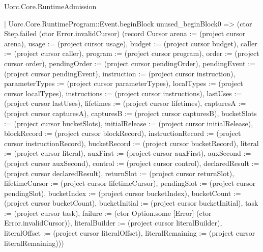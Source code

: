 \begin{lexlean}{Uorc.Core.RuntimeAdmission}
\begin{semanticmodule}
{          | Uorc.Core.RuntimeProgram::Event.beginBlock unused_beginBlock0 => (ctor Step.failed (ctor Error.invalidCursor) (record Cursor {arena := (project cursor arena), usage := (project cursor usage), budget := (project cursor budget), caller := (project cursor caller), program := (project cursor program), order := (project cursor order), pendingOrder := (project cursor pendingOrder), pendingEvent := (project cursor pendingEvent), instruction := (project cursor instruction), parameterTypes := (project cursor parameterTypes), localTypes := (project cursor localTypes), instructions := (project cursor instructions), lastUses := (project cursor lastUses), lifetimes := (project cursor lifetimes), capturesA := (project cursor capturesA), capturesB := (project cursor capturesB), bucketSlots := (project cursor bucketSlots), initialRelease := (project cursor initialRelease), blockRecord := (project cursor blockRecord), instructionRecord := (project cursor instructionRecord), bucketRecord := (project cursor bucketRecord), literal := (project cursor literal), auxFirst := (project cursor auxFirst), auxSecond := (project cursor auxSecond), control := (project cursor control), declaredResult := (project cursor declaredResult), returnSlot := (project cursor returnSlot), lifetimeCursor := (project cursor lifetimeCursor), pendingSlot := (project cursor pendingSlot), bucketIndex := (project cursor bucketIndex), bucketCount := (project cursor bucketCount), bucketInitial := (project cursor bucketInitial), task := (project cursor task), failure := (ctor Option.some [Error] (ctor Error.invalidCursor)), literalBuilder := (project cursor literalBuilder), literalOffset := (project cursor literalOffset), literalRemaining := (project cursor literalRemaining)}))
}
\end{semanticmodule}
\end{lexlean}
